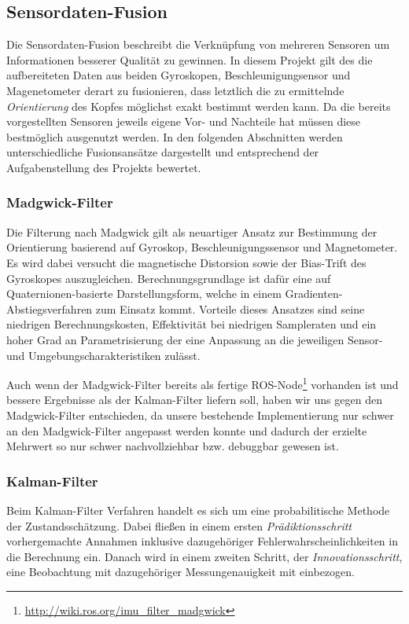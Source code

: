 
\subsection{Sensordaten-Fusion}
\label{headtracking_fusion_subsec}
Die Sensordaten-Fusion beschreibt die Verknüpfung von mehreren Sensoren um Informationen besserer Qualität zu gewinnen. In diesem Projekt gilt des die aufbereiteten Daten aus beiden Gyroskopen, Beschleunigungsensor und Magenetometer derart zu fusionieren, dass letztlich die zu ermittelnde \emph{Orientierung} des Kopfes möglichst exakt bestimmt werden kann. Da die bereits vorgestellten Sensoren jeweils eigene Vor- und Nachteile hat müssen diese bestmöglich ausgenutzt werden. In den folgenden Abschnitten werden unterschiedliche Fusionsansätze dargestellt und entsprechend der Aufgabenstellung des Projekts bewertet. 

\subsubsection{Madgwick-Filter}
Die Filterung nach Madgwick \cite{madgwick2010efficient} gilt als neuartiger Ansatz zur Bestimmung der Orientierung basierend auf Gyroskop, Beschleunigungssensor und Magnetometer.
Es wird dabei versucht die magnetische Distorsion sowie der Bias-Trift des Gyroskopes auszugleichen.
Berechnungsgrundlage ist dafür eine auf Quaternionen-basierte Darstellungsform, welche in einem Gradienten-Abstiegsverfahren zum Einsatz kommt.
Vorteile dieses Ansatzes sind seine niedrigen Berechnungskosten, Effektivität bei niedrigen Sampleraten und ein hoher Grad an Parametrisierung der eine Anpassung an die jeweiligen Sensor- und Umgebungscharakteristiken zulässt.

Auch wenn der Madgwick-Filter bereits als fertige ROS-Node\footnote{\url{http://wiki.ros.org/imu_filter_madgwick}} vorhanden ist und bessere Ergebnisse als der Kalman-Filter liefern soll, haben wir uns gegen den Madgwick-Filter entschieden, da unsere bestehende Implementierung nur schwer an den Madgwick-Filter angepasst werden konnte und dadurch der erzielte Mehrwert so nur schwer nachvollziehbar bzw. debuggbar gewesen ist. 


\subsubsection{Kalman-Filter}
Beim Kalman-Filter Verfahren \cite{kalman1960new} handelt es sich um eine probabilitische Methode der Zustandsschätzung.
Dabei fließen in einem ersten \emph{Prädiktionsschritt} vorhergemachte Annahmen inklusive dazugehöriger Fehlerwahrscheinlichkeiten in die Berechnung ein.
Danach wird in einem zweiten Schritt, der \emph{Innovationsschritt}, eine Beobachtung mit dazugehöriger Messungenauigkeit mit einbezogen.

